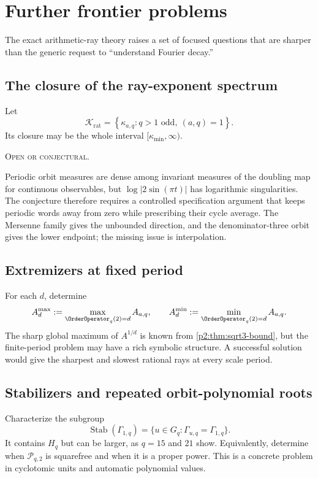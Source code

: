 \documentclass[11pt,oneside]{article}
\theoremstyle{definition}
\theoremstyle{remark}
\newcommand{\openstatus}{\textcolor{conjectureorange}{\textsc{Open or conjectural.}}}
\begin{document}
\section{Further frontier problems}\label{p2:sec:open}

The exact arithmetic-ray theory raises a set of focused questions that are sharper
than the generic request to ``understand Fourier decay.''

\subsection{The closure of the ray-exponent spectrum}

\begin{conjecture}
Let
\[
 \mathcal K_{\mathrm{rat}}=
 \left\{\kappa_{a,q}:q>1\text{ odd},\ (a,q)=1\right\}.
\]
Its closure may be the whole interval $[\kappa_{\min},\infty)$.

\smallskip\noindent\openstatus
\end{conjecture}

Periodic orbit measures are dense among invariant measures of the doubling map for
continuous observables, but $\log|2\sin(\pi t)|$ has logarithmic singularities. The
conjecture therefore requires a controlled specification argument that keeps
periodic words away from zero while prescribing their cycle average. The Mersenne
family gives the unbounded direction, and the denominator-three orbit gives the
lower endpoint; the missing issue is interpolation.

\subsection{Extremizers at fixed period}

For each $d$, determine
\[
 A_d^{\max}:=\max_{\OrderOperator_q(2)=d}A_{a,q},
 \qquad
 A_d^{\min}:=\min_{\OrderOperator_q(2)=d}A_{a,q}.
\]
The sharp global maximum of $A^{1/d}$ is known from \cref{p2:thm:sqrt3-bound}, but the
finite-period problem may have a rich symbolic structure. A successful solution
would give the sharpest and slowest rational rays at every scale period.

\subsection{Stabilizers and repeated orbit-polynomial roots}

Characterize the subgroup
\[
 \operatorname{Stab}(\Gamma_{1,q})
 =\{u\in G_q:\Gamma_{u,q}=\Gamma_{1,q}\}.
\]
It contains $H_q$ but can be larger, as $q=15$ and $21$ show. Equivalently, determine
when $\mathscr P_{q,2}$ is squarefree and when it is a proper power. This is a
concrete problem in cyclotomic units and automatic polynomial values.
\end{document}
